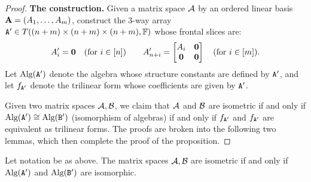 \documentclass[11pt]{article}
\begin{document}
\newcommand{\Alg}{\text{Alg}}
\begin{proof}
\textbf{The construction.} Given a matrix space $\mathcal{A}$ by an ordered linear basis $\mathbf{A} = (A_1, \dotsc, A_m)$, construct the 3-way array $\mathtt{A}' \in T((n+m) \times (n+m) \times (n+m), \mathbb{F})$ whose frontal slices are:
\[
A_i' = \mathbf{0} \quad (\text{for } i \in [n]) \qquad A_{n+i}' = \begin{bmatrix} A_i & \mathbf{0} \\ \mathbf{0} & \mathbf{0} \end{bmatrix} \quad (\text{for } i \in [m]).
\]
Let $\Alg(\tA')$ denote the algebra whose structure constants are defined by $\mathtt{A}'$, and let $f_{\mathtt{A}'}$ denote the trilinear form whose coefficients are given by $\mathtt{A}'$. 

Given two matrix spaces $\mathcal{A}, \mathcal{B}$, we claim that $\mathcal{A}$ and $\mathcal{B}$ are isometric if and only if $\Alg(\tA') \cong \Alg(\tB')$ (isomorphism of algebras) if and only if $f_{\mathtt{A}'}$ and $f_{\mathtt{A}'}$ are equivalent as trilinear forms. The proofs are broken into the following two lemmas, which then complete the proof of the proposition.
\end{proof}

\begin{lemma}\label{lem:VVW_VVVstar}
Let notation be as above. The matrix spaces $\mathcal{A},\mathcal{B}$ are isometric if and only if $\Alg(\tA')$ and $\Alg(\tB')$ are isomorphic.
\end{lemma}
\end{document}

